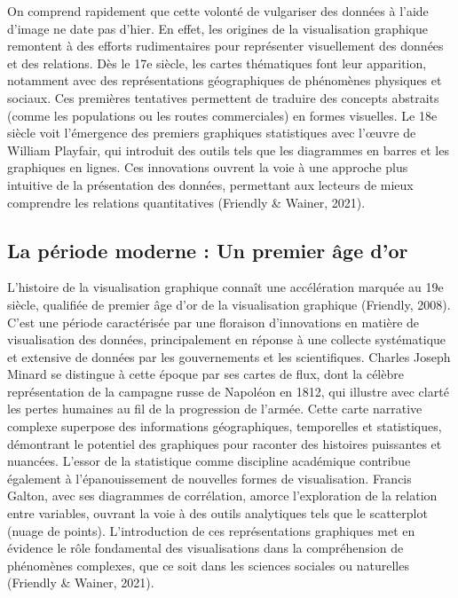 \documentclass[
  letterpaper,
  DIV=11,
  numbers=noendperiod]{scrreprt}
\begin{document}
On comprend rapidement que cette volonté de vulgariser des données à
l'aide d'image ne date pas d'hier. En effet, les origines de la
visualisation graphique remontent à des efforts rudimentaires pour
représenter visuellement des données et des relations. Dès le 17e
siècle, les cartes thématiques font leur apparition, notamment avec des
représentations géographiques de phénomènes physiques et sociaux. Ces
premières tentatives permettent de traduire des concepts abstraits
(comme les populations ou les routes commerciales) en formes visuelles.
Le 18e siècle voit l'émergence des premiers graphiques statistiques avec
l'œuvre de William Playfair, qui introduit des outils tels que les
diagrammes en barres et les graphiques en lignes. Ces innovations
ouvrent la voie à une approche plus intuitive de la présentation des
données, permettant aux lecteurs de mieux comprendre les relations
quantitatives (Friendly \& Wainer, 2021).

\subsection{La période moderne : Un premier âge
d'or}\label{la-puxe9riode-moderne-un-premier-uxe2ge-dor}

L'histoire de la visualisation graphique connaît une accélération
marquée au 19e siècle, qualifiée de premier âge d'or de la visualisation
graphique (Friendly, 2008). C'est une période caractérisée par une
floraison d'innovations en matière de visualisation des données,
principalement en réponse à une collecte systématique et extensive de
données par les gouvernements et les scientifiques. Charles Joseph
Minard se distingue à cette époque par ses cartes de flux, dont la
célèbre représentation de la campagne russe de Napoléon en 1812, qui
illustre avec clarté les pertes humaines au fil de la progression de
l'armée. Cette carte narrative complexe superpose des informations
géographiques, temporelles et statistiques, démontrant le potentiel des
graphiques pour raconter des histoires puissantes et nuancées. L'essor
de la statistique comme discipline académique contribue également à
l'épanouissement de nouvelles formes de visualisation. Francis Galton,
avec ses diagrammes de corrélation, amorce l'exploration de la relation
entre variables, ouvrant la voie à des outils analytiques tels que le
scatterplot (nuage de points). L'introduction de ces représentations
graphiques met en évidence le rôle fondamental des visualisations dans
la compréhension de phénomènes complexes, que ce soit dans les sciences
sociales ou naturelles (Friendly \& Wainer, 2021).
\end{document}
